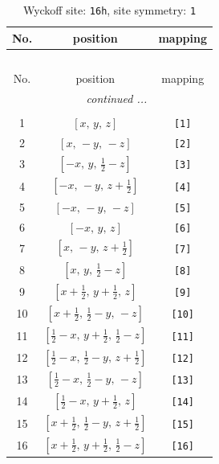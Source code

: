 \documentclass[fleqn,8pt]{jsarticle}
\begin{document}
\begin{longtable}{ccc}
\caption{Wyckoff site: {\tt 16h}, site symmetry: {\tt 1}}
 \\
 \hline \hline
No. & position & mapping \\ \hline \endfirsthead

\multicolumn{2}{l}{\tablename\ \thetable{}} \\
 \hline \hline
No. & position & mapping \\ \hline \endhead

 \hline \hline
\multicolumn{2}{r}{\footnotesize\it continued ...} \\ \endfoot

 \hline \hline
\multicolumn{2}{r}{} \\ \endlastfoot

1 & $\left[ x,\, y,\, z \right]$ & {\tt [1]} \\ \hline
2 & $\left[ x,\, - y,\, - z \right]$ & {\tt [2]} \\ \hline
3 & $\left[ - x,\, y,\, \frac{1}{2} - z \right]$ & {\tt [3]} \\ \hline
4 & $\left[ - x,\, - y,\, z + \frac{1}{2} \right]$ & {\tt [4]} \\ \hline
5 & $\left[ - x,\, - y,\, - z \right]$ & {\tt [5]} \\ \hline
6 & $\left[ - x,\, y,\, z \right]$ & {\tt [6]} \\ \hline
7 & $\left[ x,\, - y,\, z + \frac{1}{2} \right]$ & {\tt [7]} \\ \hline
8 & $\left[ x,\, y,\, \frac{1}{2} - z \right]$ & {\tt [8]} \\ \hline
9 & $\left[ x + \frac{1}{2},\, y + \frac{1}{2},\, z \right]$ & {\tt [9]} \\ \hline
10 & $\left[ x + \frac{1}{2},\, \frac{1}{2} - y,\, - z \right]$ & {\tt [10]} \\ \hline
11 & $\left[ \frac{1}{2} - x,\, y + \frac{1}{2},\, \frac{1}{2} - z \right]$ & {\tt [11]} \\ \hline
12 & $\left[ \frac{1}{2} - x,\, \frac{1}{2} - y,\, z + \frac{1}{2} \right]$ & {\tt [12]} \\ \hline
13 & $\left[ \frac{1}{2} - x,\, \frac{1}{2} - y,\, - z \right]$ & {\tt [13]} \\ \hline
14 & $\left[ \frac{1}{2} - x,\, y + \frac{1}{2},\, z \right]$ & {\tt [14]} \\ \hline
15 & $\left[ x + \frac{1}{2},\, \frac{1}{2} - y,\, z + \frac{1}{2} \right]$ & {\tt [15]} \\ \hline
16 & $\left[ x + \frac{1}{2},\, y + \frac{1}{2},\, \frac{1}{2} - z \right]$ & {\tt [16]} \\
\end{longtable}
\end{document}
